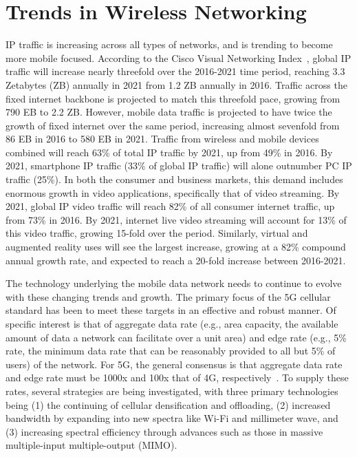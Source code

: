 \documentclass[12pt,dvipsnames]{report}
\begin{document}
\section{Trends in Wireless Networking} \label{sec:netreview}

IP traffic is increasing across all types of networks, and is trending to become more mobile focused.  According to the Cisco Visual Networking Index~\cite{ciscoVNI2017}, global IP traffic will increase nearly threefold over the 2016-2021 time period, reaching 3.3 Zetabytes (ZB) annually in 2021 from 1.2 ZB annually in 2016.  Traffic across the fixed internet backbone is projected to match this threefold pace, growing from 790 EB to 2.2 ZB.  However, mobile data traffic is projected to have twice the growth of fixed internet over the same period, increasing almost sevenfold from 86 EB in 2016 to 580 EB in 2021.  Traffic from wireless and mobile devices combined will reach 63\% of total IP traffic by 2021, up from 49\% in 2016.  By 2021, smartphone IP traffic (33\% of global IP traffic) will alone outnumber PC IP traffic (25\%).  In both the consumer and business markets, this demand includes enormous growth in video applications, specifically that of video streaming.  By 2021, global IP video traffic will reach 82\% of all consumer internet traffic, up from 73\% in 2016.  By 2021, internet live video streaming will account for 13\% of this video traffic, growing 15-fold over the period.  Similarly, virtual and augmented reality uses will see the largest increase, growing at a 82\% compound annual growth rate, and expected to reach a 20-fold increase between 2016-2021.

The technology underlying the mobile data network needs to continue to evolve with these changing trends and growth.  The primary focus of the 5G cellular standard has been to meet these targets in an effective and robust manner.  Of specific interest is that of aggregate data rate (e.g., area capacity, the available amount of data a network can facilitate over a unit area) and edge rate (e.g., 5\% rate, the minimum data rate that can be reasonably provided to all but 5\% of users) of the network.  For 5G, the general consensus is that aggregate data rate and edge rate must be 1000x and 100x that of 4G, respectively~\cite{6824752}.  To supply these rates, several strategies are being investigated, with three primary technologies being (1) the continuing of cellular densification and offloading, (2) increased bandwidth by expanding into new spectra like Wi-Fi and millimeter wave, and (3) increasing spectral efficiency through advances such as those in massive multiple-input multiple-output (MIMO).
\end{document}
